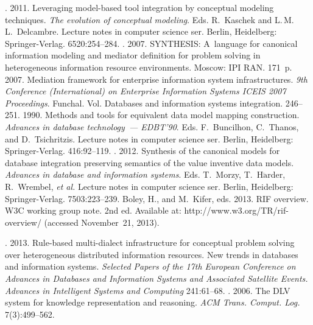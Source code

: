 \begin{multicols}{2}
{{\begin{thebibliography}{99}
. 2011. Leveraging
model-based tool integration by conceptual modeling techniques. \textit{The evolution of
conceptual modeling}. Eds. R.~Kaschek and L.\,M.\,L.~Delcambre. Lecture notes in computer science ser.
Berlin, Heidelberg: Springer-Verlag. 6520:254--284.
. 2007. SYNTHESIS:
A~language for canonical information modeling and mediator definition for problem
solving in heterogeneous information resource environments. Moscow: IPI RAN. 171~p.
 2007. Mediation framework for enterprise information system
infrastructures. \textit{9th Conference (International) on Enterprise Information Systems
ICEIS 2007 Proceedings}. Funchal. Vol. Databases and information systems integration.
 246--251.
 1990. Methods and tools for equivalent data model mapping
construction. \textit{Advances in database technology~---
EDBT'90}. Eds. F.~Buncilhon, C.~Thanos, and D.~Tsichritzis. Lecture notes in
computer science ser. Berlin, Heidelberg: Springer-Verlag. 416:92--119.
. 2012. Synthesis of the canonical models
for database integration preserving semantics of the value inventive data models.
\textit{Advances in database and information systems}. Eds. T.~Morzy,
T.~H$\ddot{\mbox{a}}$rder, R.~Wrembel,
\textit{et al.} Lecture notes in computer science ser. Berlin, Heidelberg: Springer-Verlag.
7503:223--239.
Boley, H., and M.~Kifer, eds. 2013. RIF overview. W3C working group
note. 2nd ed. Available at: {\sf http://www.w3.org/TR/rif-overview/} (accessed November~21,  2013).


. 2013. Rule-based
multi-dialect infrastructure for conceptual problem solving over heterogeneous distributed
information resources. New trends in databases and information systems. \textit{Selected
Papers of the 17th European Conference on Advances in Databases and Information
Systems and Associated Satellite Events. Advances in Intelligent Systems and Computing}
241:61--68.
.
2006. The DLV system for knowledge representation and reasoning. \textit{ACM
Trans. Comput. Log.} 7(3):499--562.


\end{thebibliography}}}
\end{multicols}
